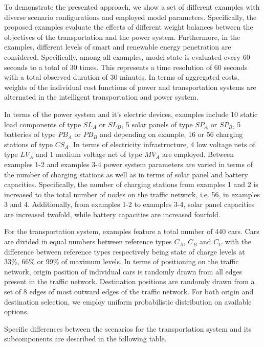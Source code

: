 To demonstrate the presented approach, we show a set of different examples with diverse scenario configurations and employed model parameters. Specifically, the proposed examples evaluate the effects of different weight balances between the objectives of the transportation and the power system. 
Furthermore, in the examples, different levels of smart and renewable energy penetration are considered. Specifically, among all examples, model state is evaluated every 60 seconds to a total of 30 times. This represents a time resolution of 60 seconds with a total observed duration of 30 minutes. 
In terms of aggregated costs, weights of the individual cost functions of power and transportation systems are alternated in the intelligent transportation and power system.

In terms of the power system and it's electric devices, examples include 10 static load components of type $SL_{A}$ or $SL_{B}$, 5 solar panels of type $SP_{A}$ or $SP_{B}$, 5 batteries of type $PB_{A}$ or $PB_{B}$ and depending on example, 16 or 56 charging stations of type $CS_{A}$. In terms of electricity infrastructure, 4 low voltage nets of type $LV_{A}$ and 1 medium voltage net of type $MV_{A}$ are employed. 
Between examples 1-2 and examples 3-4 power system parameters are varied in terms of the number of charging stations as well as in terms of solar panel and battery capacities. Specifically, the number of charging stations from examples 1 and 2 is increased to the total number of nodes on the traffic network, i.e. 56, in examples 3 and 4. Additionally, from examples 1-2 to examples 3-4, solar panel capacities are increased twofold, while battery capacities are increased fourfold. 

For the transportation system, examples feature a total number of 440 cars. Cars are divided in equal numbers between reference types $C_{A}$, $C_{B}$ and $C_{C}$ with the difference between reference types respectively being state of charge levels at 33\%, 66\% or 99\% of maximum levels. In terms of positioning on the traffic network, origin position of individual cars is randomly drawn from all edges present in the traffic network. Destination positions are randomly drawn from a set of 8 edges of most outward edges of the traffic network. For both origin and destination selection, we employ uniform probabilistic distribution on available options. 

Specific differences between the scenarios for the transportation system and its subcomponents are described in the following table. 

